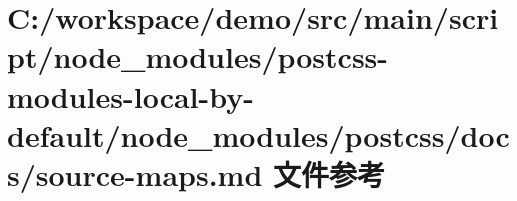 \hypertarget{postcss-modules-local-by-default_2node__modules_2postcss_2docs_2source-maps_8md}{}\section{C\+:/workspace/demo/src/main/script/node\+\_\+modules/postcss-\/modules-\/local-\/by-\/default/node\+\_\+modules/postcss/docs/source-\/maps.md 文件参考}
\label{postcss-modules-local-by-default_2node__modules_2postcss_2docs_2source-maps_8md}
